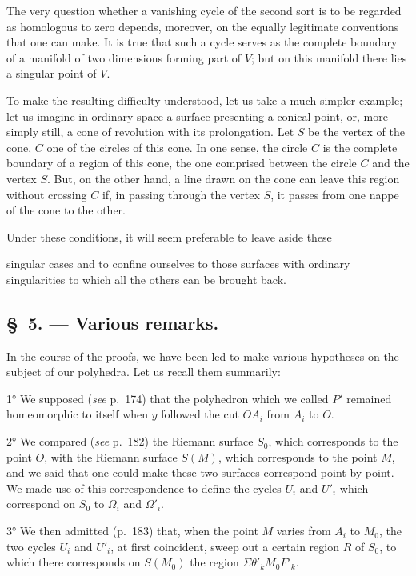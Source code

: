 \documentclass{article}
\begin{document}
The very question whether a vanishing cycle of the second sort is to be regarded as homologous to zero depends, moreover, on the equally legitimate conventions that one can make. It is true that such a cycle serves as the complete boundary of a manifold of two dimensions forming part of $V$; but on this manifold there lies a singular point of $V$.

To make the resulting difficulty understood, let us take a much simpler example; let us imagine in ordinary space a surface presenting a conical point, or, more simply still, a cone of revolution with its prolongation. Let $S$ be the vertex of the cone, $C$ one of the circles of this cone. In one sense, the circle $C$ is the complete boundary of a region of this cone, the one comprised between the circle $C$ and the vertex $S$. But, on the other hand, a line drawn on the cone can leave this region without crossing $C$ if, in passing through the vertex $S$, it passes from one nappe of the cone to the other.

Under these conditions, it will seem preferable to leave aside these

singular cases and to confine ourselves to those surfaces with ordinary singularities to which all the others can be brought back.

\subsection*{\S~5. --- Various remarks.}

In the course of the proofs, we have been led to make various hypotheses on the subject of our polyhedra. Let us recall them summarily:

1° We supposed (\emph{see} p.\ 174) that the polyhedron which we called $P'$ remained homeomorphic to itself when $y$ followed the cut $OA_{i}$ from $A_{i}$ to $O$.

2° We compared (\emph{see} p.\ 182) the Riemann surface $S_{0}$, which corresponds to the point $O$, with the Riemann surface $S(M)$, which corresponds to the point $M$, and we said that one could make these two surfaces correspond point by point. We made use of this correspondence to define the cycles $U_{i}$ and $U'_{i}$ which correspond on $S_{0}$ to $\Omega_{i}$ and $\Omega'_{i}$.

3° We then admitted (p.\ 183) that, when the point $M$ varies from $A_{i}$ to $M_{0}$, the two cycles $U_{i}$ and $U'_{i}$, at first coincident, sweep out a certain region $R$ of $S_{0}$, to which there corresponds on $S(M_{0})$ the region $\Sigma \theta'_{k} M_{0}F'_{k}$.
\end{document}
